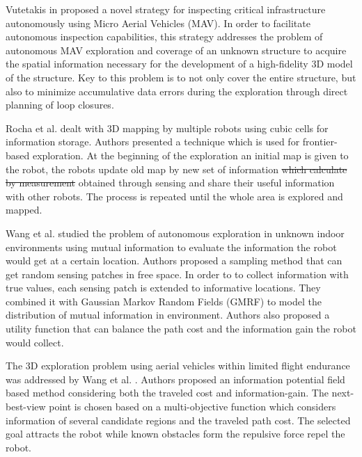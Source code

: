 Vutetakis in \cite{Vutetakis2019} proposed a novel strategy for inspecting
critical infrastructure autonomously using Micro Aerial Vehicles (MAV). In order to facilitate autonomous inspection capabilities, this strategy addresses the problem of autonomous MAV exploration and coverage of an unknown structure to acquire the spatial information necessary for the development of a high-fidelity 3D model of the structure. Key to this problem is to not only cover the entire structure, but also to minimize accumulative data errors during the exploration through direct planning of loop closures. 

Rocha et al. \cite{Rocha2005} dealt with 3D mapping by multiple robots using cubic cells for information storage. Authors presented a technique which is used for frontier-based exploration. At the beginning of the exploration an initial map is given to the robot, the robots update old map by new set of information \st{which calculate by measurement} {\color{red}obtained through sensing} and share their useful information with other robots. The process is repeated until the whole area is explored and mapped.

Wang et al. \cite{Wang2018} studied the problem of autonomous exploration in unknown indoor environments using mutual information to evaluate the information the robot would get at a certain location. Authors proposed a
sampling method that can get random sensing patches in free space. In order to to collect information with true values, each sensing patch is extended to informative locations. They combined it with Gaussian
Markov Random Fields (GMRF) to model the distribution of mutual information in environment.  Authors also proposed a utility function that can balance the path cost and the information gain the robot
would collect.

The 3D exploration problem using aerial vehicles within limited flight endurance was addressed by Wang et al. \cite{Wang2019}. Authors proposed an information potential field based method considering both the traveled cost and information-gain. The next-best-view point is chosen based on a multi-objective function which considers information of several candidate regions and the traveled path cost. The selected goal
attracts the robot while known obstacles form the repulsive
force repel the robot.



